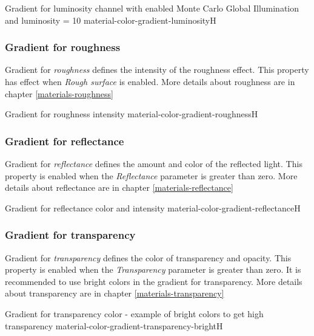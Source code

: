 {Gradient for luminosity channel with enabled Monte Carlo Global Illumination and luminosity = 10}
{material-color-gradient-luminosity}{H}

\subsubsection{Gradient for roughness}\label{materials-roughness-gradient}

Gradient for \emph{roughness} defines the intensity of the roughness effect. This property has effect when \emph{Rough surface} is enabled. More details about roughness are in chapter \ref{materials-roughness}

{Gradient for roughness intensity}
{material-color-gradient-roughness}{H}

\pagebreak
\subsubsection{Gradient for reflectance}\label{materials-reflectance-gradient}

Gradient for \emph{reflectance} defines the amount and color of the reflected light. This property is enabled when the \emph{Reflectance} parameter is greater than zero. More details about reflectance are in chapter \ref{materials-reflectance}

{Gradient for reflectance color and intensity}
{material-color-gradient-reflectance}{H}

\subsubsection{Gradient for transparency}\label{materials-transparency-gradient}

Gradient for \emph{transparency} defines the color of transparency and opacity. This property is enabled when the \emph{Transparency} parameter is greater than zero. 
It is recommended to use bright colors in the gradient for transparency. More details about transparency are in chapter \ref{materials-transparency}

{Gradient for transparency color - example of bright colors to get high transparency}
{material-color-gradient-transparency-bright}{H}

